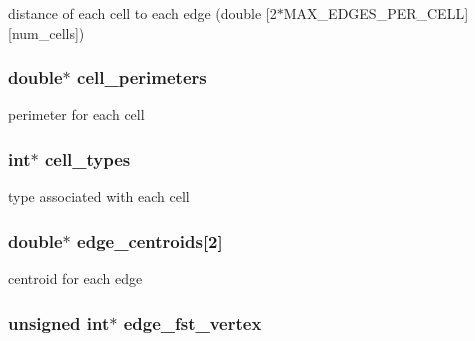 distance of each cell to each edge (double \mbox{[}2$\ast$MAX\_\-EDGES\_\-PER\_\-CELL\mbox{]}\mbox{[}num\_\-cells\mbox{]}) 

\hypertarget{structFVL_1_1CFVMesh2D_1_1CFVMesh2D__cuda_a05366b974186ac70d633948b29c56384}{
\subsubsection[{cell\_\-perimeters}]{\setlength{\rightskip}{0pt plus 5cm}double$\ast$ {\bf cell\_\-perimeters}}}
\label{d6/d30/structFVL_1_1CFVMesh2D_1_1CFVMesh2D__cuda_a05366b974186ac70d633948b29c56384}


perimeter for each cell 

\hypertarget{structFVL_1_1CFVMesh2D_1_1CFVMesh2D__cuda_a294a0484d68f983a11a627a5df0a767a}{
\subsubsection[{cell\_\-types}]{\setlength{\rightskip}{0pt plus 5cm}int$\ast$ {\bf cell\_\-types}}}
\label{d6/d30/structFVL_1_1CFVMesh2D_1_1CFVMesh2D__cuda_a294a0484d68f983a11a627a5df0a767a}


type associated with each cell 

\hypertarget{structFVL_1_1CFVMesh2D_1_1CFVMesh2D__cuda_aff4d73402091e4860e902f3f7f66a06c}{
\subsubsection[{edge\_\-centroids}]{\setlength{\rightskip}{0pt plus 5cm}double$\ast$ {\bf edge\_\-centroids}\mbox{[}2\mbox{]}}}
\label{d6/d30/structFVL_1_1CFVMesh2D_1_1CFVMesh2D__cuda_aff4d73402091e4860e902f3f7f66a06c}


centroid for each edge 

\hypertarget{structFVL_1_1CFVMesh2D_1_1CFVMesh2D__cuda_a541be23cac3c920c96257391179a196c}{
\subsubsection[{edge\_\-fst\_\-vertex}]{\setlength{\rightskip}{0pt plus 5cm}unsigned int$\ast$ {\bf edge\_\-fst\_\-vertex}}}
\label{d6/d30/structFVL_1_1CFVMesh2D_1_1CFVMesh2D__cuda_a541be23cac3c920c96257391179a196c}


